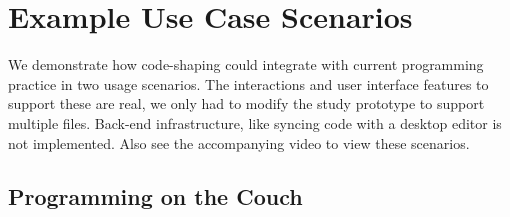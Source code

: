 \section{Example Use Case Scenarios}
We demonstrate how code-shaping could integrate with current programming practice in two usage scenarios. The interactions and user interface features to support these are real, we only had to modify the study prototype to support multiple files. Back-end infrastructure, like syncing code with a desktop editor is not implemented. Also see the accompanying video to view these scenarios.

\subsection{Programming on the Couch}
